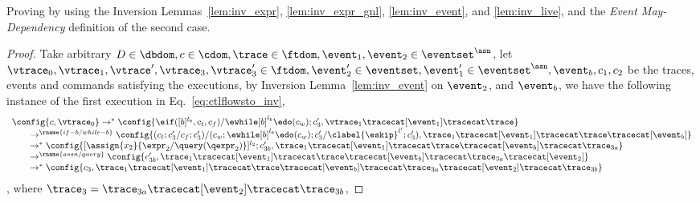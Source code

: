 	Proving by using the Inversion Lemmas~\ref{lem:inv_expr}, \ref{lem:inv_expr_gnl}, 
	\ref{lem:inv_event}, and \ref{lem:inv_live}, and the \emph{Event May-Dependency} definition of the second case.
%
	\begin{proof}
		Take arbitrary $D \in \dbdom , c \in \cdom, \trace \in \ftdom,
		\event_1, \event_2 \in \eventset^{\asn} $,
%
let $\vtrace_0,
\vtrace_1, \vtrace', \vtrace_3, \vtrace_3' \in \ftdom, 
\event_2' \in \eventset, \event_1' \in \eventset^{\asn}, \event_b, {c}_1, {c}_2$ be the traces, 
events and commands satisfying the executions,
by Inversion Lemma~\ref{lem:inv_event} on 
$\event_2$, and $\event_b$,
we have the following instance of the first execution in Eq.~\ref{eq:ctlflowsto_inv},
%
\begin{equation}
  \begin{array}{l}   
\config{{c}, \vtrace_0} \rightarrow^{*} 
  \config{\eif ([b]^{l_b}, c_t, c_f) / \ewhile [b]^{l_b} \edo (c_w);{c}_3', 
  \vtrace_1 \tracecat [\event_1] \tracecat \trace} 
  \\
  \qquad 
   \rightarrow^{\rname{if-b / while-b}} 
  \config{(c_t;c_3' / c_f;c_3') /(c_w; \ewhile [b]^{l_b} \edo (c_w);c_3'/\clabel{\eskip}^{l'}; c_3'), 
  \trace_1 \tracecat [\event_1] \tracecat \trace \tracecat [\event_b]} 
  \\
  \qquad  \rightarrow^{*} 
  \config{[\assign{{x}_2}{\expr_2 / \query(\qexpr_2)}]^{l_2}; c_{3b}', 
  \trace_1 \tracecat [\event_1] \tracecat \trace \tracecat [\event_b] \tracecat  \trace_{3a}}
  \\ \qquad \rightarrow^{\rname{assn/query}}
  \config{ c_{3b}', 
  \trace_1 \tracecat [\event_1] \tracecat \trace \tracecat [\event_b] \tracecat  \trace_{3a} \tracecat [\event_2]}
  \\ \qquad
  \rightarrow^{*} 
  \config{c_3, 
  \trace_1 \tracecat [\event_1] \tracecat \trace \tracecat [\event_b] \tracecat  \trace_{3a} \tracecat [\event_2] \tracecat \trace_{3b}}
\end{array}
\end{equation}
, where $\trace_3 = \trace_{3a} \tracecat [\event_2] \tracecat \trace_{3b}$,

\end{proof}
